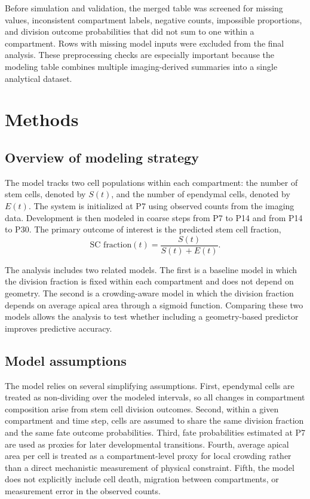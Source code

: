 \documentclass[12pt]{article}
\begin{document}
Before simulation and validation, the merged table was screened for missing values, inconsistent compartment labels, negative counts, impossible proportions, and division outcome probabilities that did not sum to one within a compartment. Rows with missing model inputs were excluded from the final analysis. These preprocessing checks are especially important because the modeling table combines multiple imaging-derived summaries into a single analytical dataset.

\section{Methods}

\subsection{Overview of modeling strategy}

The model tracks two cell populations within each compartment: the number of stem cells, denoted by $S(t)$, and the number of ependymal cells, denoted by $E(t)$. The system is initialized at P7 using observed counts from the imaging data. Development is then modeled in coarse steps from P7 to P14 and from P14 to P30. The primary outcome of interest is the predicted stem cell fraction,
\[
\text{SC fraction}(t) = \frac{S(t)}{S(t)+E(t)}.
\]

The analysis includes two related models. The first is a baseline model in which the division fraction is fixed within each compartment and does not depend on geometry. The second is a crowding-aware model in which the division fraction depends on average apical area through a sigmoid function. Comparing these two models allows the analysis to test whether including a geometry-based predictor improves predictive accuracy.

\subsection{Model assumptions}

The model relies on several simplifying assumptions. First, ependymal cells are treated as non-dividing over the modeled intervals, so all changes in compartment composition arise from stem cell division outcomes. Second, within a given compartment and time step, cells are assumed to share the same division fraction and the same fate outcome probabilities. Third, fate probabilities estimated at P7 are used as proxies for later developmental transitions. Fourth, average apical area per cell is treated as a compartment-level proxy for local crowding rather than a direct mechanistic measurement of physical constraint. Fifth, the model does not explicitly include cell death, migration between compartments, or measurement error in the observed counts.
\end{document}
